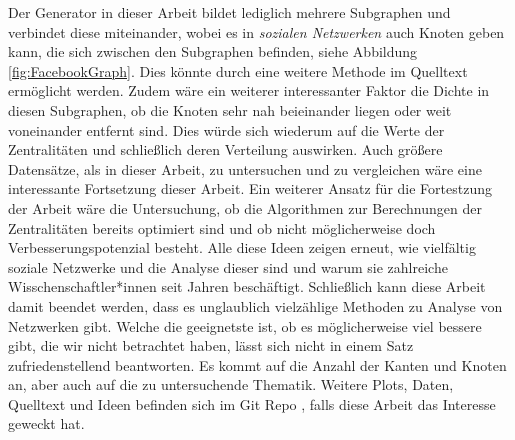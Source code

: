 Der Generator in dieser Arbeit bildet lediglich mehrere Subgraphen und verbindet diese miteinander, wobei es in \textit{sozialen Netzwerken} auch Knoten geben kann, die sich zwischen den Subgraphen befinden, siehe Abbildung \ref{fig:FacebookGraph}. Dies könnte durch eine weitere Methode im Quelltext ermöglicht werden. Zudem wäre ein weiterer interessanter Faktor die Dichte in diesen Subgraphen, ob die Knoten sehr nah beieinander liegen oder weit voneinander entfernt sind. Dies würde sich wiederum auf die Werte der Zentralitäten und schließlich deren Verteilung auswirken.
Auch größere Datensätze, als in dieser Arbeit, zu untersuchen und zu vergleichen wäre eine interessante Fortsetzung dieser Arbeit. Ein weiterer Ansatz für die Fortestzung der Arbeit wäre die Untersuchung, ob die Algorithmen zur Berechnungen der Zentralitäten bereits optimiert sind und ob nicht möglicherweise doch Verbesserungspotenzial besteht.  
Alle diese Ideen zeigen erneut, wie vielfältig soziale Netzwerke und die Analyse dieser sind und warum sie zahlreiche Wisschenschaftler*innen seit Jahren beschäftigt. Schließlich kann diese Arbeit damit beendet werden, dass es unglaublich vielzählige Methoden zu Analyse von Netzwerken gibt. Welche die geeignetste ist, ob es möglicherweise viel bessere gibt, die wir nicht betrachtet haben, lässt sich nicht in einem Satz zufriedenstellend beantworten. Es kommt auf die Anzahl der Kanten und Knoten an, aber auch auf die zu untersuchende Thematik.
Weitere Plots, Daten, Quelltext und Ideen befinden sich im Git Repo \cite{TZ}, falls diese Arbeit das Interesse geweckt hat.